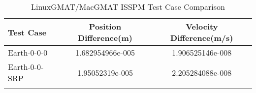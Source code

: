 \begin{table}[htbp!]
\centering
\caption{ LinuxGMAT/MacGMAT ISSPM Test Case Comparison}
      \begin{tabular}{lcc}
      \hline\hline
          Test Case & Position Difference(m) & Velocity Difference(m/s) \\
         \hline
         Earth-0-0-0 & 1.682954966e-005 & 1.906525146e-008 \\
         Earth-0-0-SRP & 1.95052319e-005 & 2.205284088e-008 \\
      \hline\hline
      \label{Table: ISSPM LinuxGMAT-MacGMAT Table} 
\end{tabular}
\end{table}
